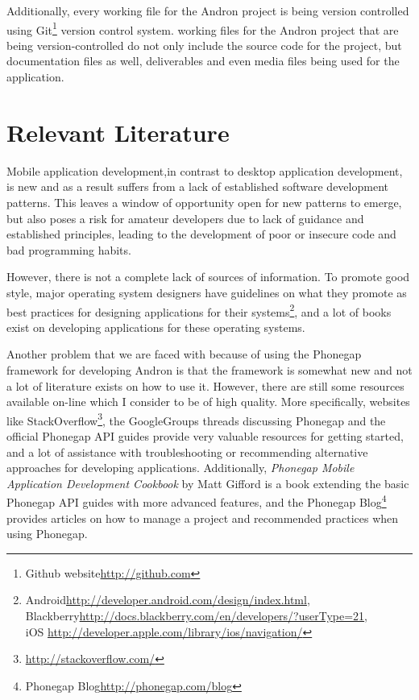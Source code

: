 \documentclass[12pt]{ecsproject}     %
\begin{document}
Additionally, every working file for the Andron project is being version controlled using Git\footnote{Github website\hyperlink{http://github.com}{http://github.com}} version control system. working files for the Andron project that are being version-controlled do not only include the source code for the project, but documentation files as well, deliverables and even media files being used for the application.

\pagebreak
\section{Relevant Literature}

Mobile application development,in contrast to desktop application development, is new and as a result suffers from a lack of established software development patterns\cite{ken}. This leaves a window of opportunity open for new patterns to emerge, but also poses a risk for amateur developers due to lack of guidance and established principles, leading to the development of poor or insecure code and bad programming habits.

However, there is not a complete lack of sources of information. To promote good style, major operating system designers have guidelines on what they promote as best practices for designing applications for their systems\footnote{Android\hyperlink{http://developer.android.com/design/index.html}{http://developer.android.com/design/index.html},\\ Blackberry\hyperlink{http://docs.blackberry.com/en/developers/?userType=21}{http://docs.blackberry.com/en/developers/?userType=21},\\  iOS \hyperlink{http://developer.apple.com/library/ios/navigation/}{http://developer.apple.com/library/ios/navigation/}}, and a lot of books exist on developing applications for these operating systems.

Another problem that we are faced with because of using the Phonegap framework for developing Andron is that the framework is somewhat new and not a lot of literature exists on how to use it. However, there are still some resources available on-line which I consider to be of high quality. More specifically, websites like StackOverflow\footnote{\hyperlink{http://stackoverflow.com/}{http://stackoverflow.com/}}, the GoogleGroups threads discussing Phonegap and the official Phonegap API guides provide very valuable resources for getting started, and a lot of assistance with troubleshooting or recommending alternative approaches for developing applications. Additionally, \emph{Phonegap Mobile Application Development Cookbook}\cite{pgcook} by Matt Gifford is a book extending the basic Phonegap API guides with more advanced features, and the Phonegap Blog\footnote{Phonegap Blog\hyperlink{http://phonegap.com/blog}{http://phonegap.com/blog}} provides articles on how to manage a project and recommended practices when using Phonegap.
\end{document}
